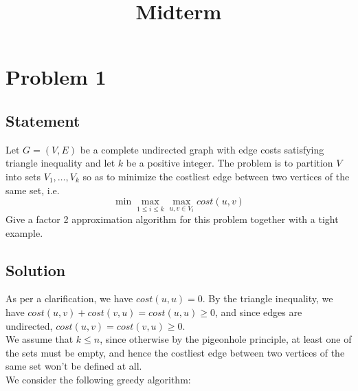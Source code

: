 \documentclass[a4paper]{article}
\title{\textbf{Midterm}}
\date{}
\newcommand{\nl}{\vspace{0.2cm}\\}
\begin{document}
\maketitle
\tableofcontents


\newpage

\section{Problem 1}

\subsection{Statement}

Let $G = (V, E)$ be a complete undirected graph with edge costs satisfying triangle inequality and let $k$ be a positive integer. The problem is to partition $V$ into sets $V_1,\ldots, V_k$ so as to minimize the costliest edge between two vertices of the same set, i.e.
$$
\min \max_{1 \le i \le k} \max_{u,v \in V_i} cost(u, v)
$$
Give a factor 2 approximation algorithm for this problem together with a tight example.

\subsection{Solution}

As per a clarification, we have $cost(u, u) = 0$. By the triangle inequality, we have $cost(u, v) + cost(v, u) = cost(u, u) \ge 0$, and since edges are
undirected, $cost(u, v) = cost(v, u) \ge 0$.\nl
We assume that $k \le n$, since otherwise by the pigeonhole principle, at least one of the sets must be empty, and hence the costliest edge between two vertices of the same set won't be defined at
all.\nl
We consider the following greedy algorithm:
\end{document}
